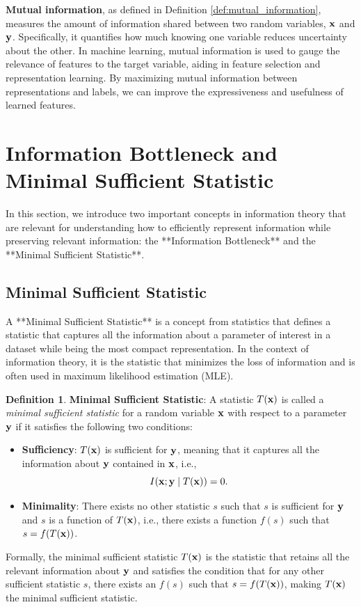 \documentclass[11pt, oneside]{book}
\theoremstyle{plain}
\theoremstyle{definition}
\newtheorem{definition}[theorem]{Definition}
\theoremstyle{remark}
\begin{document}
\textbf{Mutual information}, as defined in Definition \ref{def:mutual_information}, measures the amount of information shared between two random variables, ${\mathbf{x}}$ and ${\mathbf{y}}$. Specifically, it quantifies how much knowing one variable reduces uncertainty about the other. In machine learning, mutual information is used to gauge the relevance of features to the target variable, aiding in feature selection and representation learning. By maximizing mutual information between representations and labels, we can improve the expressiveness and usefulness of learned features.

\section{Information Bottleneck and Minimal Sufficient Statistic}

In this section, we introduce two important concepts in information theory that are relevant for understanding how to efficiently represent information while preserving relevant information: the **Information Bottleneck** and the **Minimal Sufficient Statistic**.


\subsection{Minimal Sufficient Statistic}

A **Minimal Sufficient Statistic** is a concept from statistics that defines a statistic that captures all the information about a parameter of interest in a dataset while being the most compact representation. In the context of information theory, it is the statistic that minimizes the loss of information and is often used in maximum likelihood estimation (MLE).

\begin{definition}
\textbf{Minimal Sufficient Statistic}: A statistic \( T({\mathbf{x}}) \) is called a \textit{minimal sufficient statistic} for a random variable \( {\mathbf{x}} \) with respect to a parameter \( {\mathbf{y}} \) if it satisfies the following two conditions:
\begin{itemize}
    \item \textbf{Sufficiency}: \( T({\mathbf{x}}) \) is sufficient for \( {\mathbf{y}} \), meaning that it captures all the information about \( {\mathbf{y}} \) contained in \( {\mathbf{x}} \), i.e., 
    \[
    I({\mathbf{x}}; {\mathbf{y}} \mid T({\mathbf{x}})) = 0.
    \]
    \item \textbf{Minimality}: There exists no other statistic \( s \) such that \( s \) is sufficient for \( {\mathbf{y}} \) and \( s \) is a function of \( T({\mathbf{x}}) \), i.e., there exists a function \( f(s) \) such that \( s = f(T({\mathbf{x}})) \).
\end{itemize}
Formally, the minimal sufficient statistic \( T({\mathbf{x}}) \) is the statistic that retains all the relevant information about \( {\mathbf{y}} \) and satisfies the condition that for any other sufficient statistic \( s \), there exists an \( f(s) \) such that \( s = f(T({\mathbf{x}})) \), making \( T({\mathbf{x}}) \) the minimal sufficient statistic.
\label{def:mss}
\end{definition}
\end{document}
